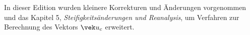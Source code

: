 %
%


In dieser Edition wurden kleinere Korrekturen und \"{A}nderungen vorgenommen und das Kapitel 5, 
{\em Steifigkeits\"{a}nderungen und Reanalysis\/}, um Verfahren zur Berechnung des Vektors $\vek u_c$ erweitert.

